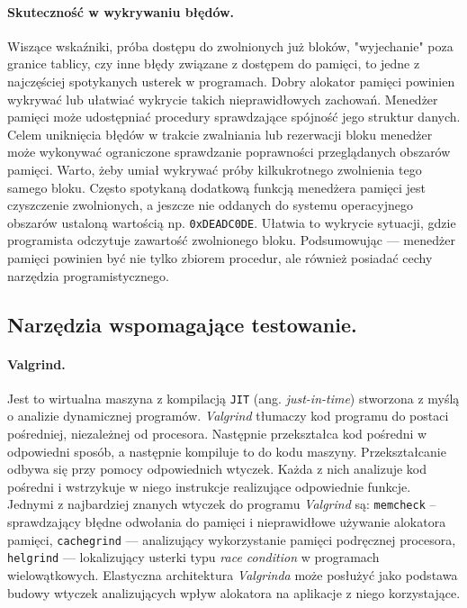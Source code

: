 \documentclass[12pt,a4paper,titlepage,twoside]{mwart}
\begin{document}
\paragraph{Skuteczność w wykrywaniu błędów.} Wiszące wskaźniki, próba dostępu
do zwolnionych już bloków, "wyjechanie" poza granice tablicy, czy inne błędy
związane z dostępem do pamięci, to jedne z najczęściej spotykanych usterek w
programach. Dobry alokator pamięci powinien wykrywać lub ułatwiać wykrycie
takich nieprawidłowych zachowań. Menedżer pamięci może udostępniać procedury
sprawdzające spójność jego struktur danych. Celem uniknięcia błędów w trakcie
zwalniania lub rezerwacji bloku menedżer może wykonywać ograniczone sprawdzanie
poprawności przeglądanych obszarów pamięci. Warto, żeby umiał wykrywać próby
kilkukrotnego zwolnienia tego samego bloku. Często spotykaną dodatkową funkcją
menedżera pamięci jest czyszczenie zwolnionych, a jeszcze nie oddanych do
systemu operacyjnego obszarów ustaloną wartością np.  \verb+0xDEADC0DE+.
Ułatwia to wykrycie sytuacji, gdzie programista odczytuje zawartość zwolnionego
bloku. Podsumowując --- menedżer pamięci powinien być nie tylko zbiorem
procedur, ale również posiadać cechy narzędzia programistycznego.

\subsection{Narzędzia wspomagające testowanie.}

\paragraph{Valgrind.} Jest to wirtualna maszyna z kompilacją \texttt{JIT} (ang.
\textit{just-in-time}) stworzona z myślą o analizie dynamicznej programów.
\textit{Valgrind} tłumaczy kod programu do postaci pośredniej, niezależnej od
procesora. Następnie przekształca kod pośredni w odpowiedni sposób, a następnie
kompiluje to do kodu maszyny. Przekształcanie odbywa się przy pomocy
odpowiednich wtyczek. Każda z nich analizuje kod pośredni i wstrzykuje w niego
instrukcje realizujące odpowiednie funkcje. Jednymi z najbardziej znanych
wtyczek do programu \textit{Valgrind} są: \texttt{memcheck} -- sprawdzający
błędne odwołania do pamięci i nieprawidłowe używanie alokatora pamięci,
\texttt{cachegrind} --- analizujący wykorzystanie pamięci podręcznej procesora,
\texttt{helgrind} --- lokalizujący usterki typu \textit{race condition} w
programach wielowątkowych. Elastyczna architektura \textit{Valgrinda} może
posłużyć jako podstawa budowy wtyczek analizujących wpływ alokatora na
aplikacje z niego korzystające.
\end{document}
